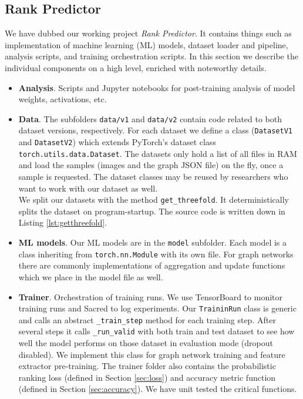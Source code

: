 \subsection{Rank Predictor}

We have dubbed our working project \textit{Rank Predictor}. It contains things such as implementation of machine learning (ML) models, dataset loader and pipeline, analysis scripts, and training orchestration scripts. In this section we describe the individual components on a high level, enriched with noteworthy details.

\begin{itemize}
    \item \textbf{Analysis}. Scripts and Jupyter notebooks for post-training analysis of model weights, activations, etc.
    \item \textbf{Data}. The subfolders \texttt{data/v1} and \texttt{data/v2} contain code related to both dataset versions, respectively. For each dataset we define a class (\texttt{DatasetV1} and \texttt{DatasetV2}) which extends PyTorch's dataset class \texttt{torch.utils.data.Dataset}. The datasets only hold a list of all files in RAM and load the samples (images and the graph JSON file) on the fly, once a sample is requested. The dataset classes may be reused by researchers who want to work with our dataset as well.\\
    We split our datasets with the method \texttt{get\_threefold}. It deterministically splits the dataset on program-startup. The source code is written down in Listing \ref{lst:getthreefold}.
    \item \textbf{ML models}. Our ML models are in the \texttt{model} subfolder. Each model is a class inheriting from \texttt{torch.nn.Module} with its own file. For graph networks there are commonly implementations of aggregation and update functions which we place in the model file as well.
    \item \textbf{Trainer}. Orchestration of training runs. We use TensorBoard to monitor training runs and Sacred to log experiments. Our \texttt{TraininRun} class is generic and calls an abstract \texttt{\_train\_step} method for each training step. After several steps it calls \texttt{\_run\_valid} with both train and test dataset to see how well the model performs on those dataset in evaluation mode (dropout disabled). We implement this class for graph network training and feature extractor pre-training. The trainer folder also contains the probabilistic ranking loss (defined in Section \ref{sec:loss}) and accuracy metric function (defined in Section \ref{sec:accuracy}). We have unit tested the critical functions.
\end{itemize}


